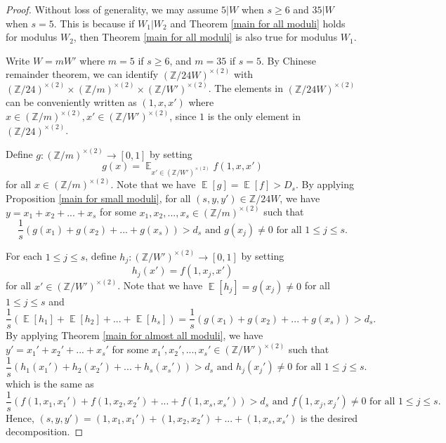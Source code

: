 \documentclass[11pt]{amsart}
\theoremstyle{plain} %
\theoremstyle{remark}
\numberwithin{equation}{section}
\newcommand{\E}{\mathop{\mathbb{E}}}
\newcommand{\Z}{\mathbb{Z}}
\begin{document}
\begin{proof}
    Without loss of generality, we may assume $5|W$ when $s\geq 6$ and $35|W$ when $s=5$. This is because if $W_1|W_2$ and Theorem \ref{main for all moduli} holds for modulus $W_2$, then Theorem \ref{main for all moduli} is also true for modulus $W_1$.

    Write $W=mW'$ where $m=5$ if $s\geq 6$, and $m=35$ if $s=5$. By Chinese remainder theorem, we can identify $(\Z/24W)^{\times(2)}$ with $(\Z/24)^{\times(2)}\times(\Z/m)^{\times(2)}\times(\Z/W')^{\times(2)}$. The elements in $(\Z/24W)^{\times(2)}$ can be conveniently written as $(1,x,x')$ where $x\in (\Z/m)^{\times(2)},x'\in (\Z/W')^{\times(2)}$, since $1$ is the only element in $(\Z/24)^{\times(2)}$.

    Define $g:(\Z/m)^{\times(2)}\longrightarrow[0,1]$ by setting
    \begin{equation*}
        g(x)=\E_{x'\in(\Z/W')^{\times(2)}}f(1,x,x')
    \end{equation*}
    for all $x\in(\Z/m)^{\times(2)}$. Note that we have $\E[g]=\E[f]>D_s$. By applying Proposition \ref{main for small moduli}, for all $(s,y,y')\in \Z/24W$, we have $y=x_1+x_2+...+x_s$ for some $x_1,x_2,...,x_s\in (\Z/m)^{\times(2)}$ such that
    \begin{equation*}
        \text{$\frac{1}{s}(g(x_1)+g(x_2)+...+g(x_s))>d_s$ and $g(x_j)\neq 0$ for all $1\leq j \leq s$.}
    \end{equation*}

    For each $1\leq j\leq s$, define $h_j:(\Z/W')^{\times(2)}\longrightarrow[0,1]$ by setting
    \begin{equation*}
        h_j(x')=f(1,x_j,x')
    \end{equation*}
    for all $x'\in (\Z/W')^{\times(2)}$. Note that we have $\E[h_j]=g(x_j)\neq 0$ for all $1\leq j\leq s$ and
    \begin{equation*}
        \frac{1}{s}(\E[h_1]+\E[h_2]+...+\E[h_s])=\frac{1}{s}(g(x_1)+g(x_2)+...+g(x_s))>d_s.
    \end{equation*}
    By applying Theorem \ref{main for almost all moduli}, we have $y'=x_1'+x_2'+...+x_s'$ for some $x_1',x_2',...,x_s'\in (\Z/W')^{\times(2)}$ such that
    \begin{equation*}
        \text{$\frac{1}{s}(h_1(x_1')+h_2(x_2')+...+h_s(x_s'))>d_s$ and $h_j(x_j')\neq 0$ for all $1\leq j \leq s$.}
    \end{equation*}
    which is the same as
    \begin{equation*}
        \text{$\frac{1}{s}(f(1,x_1,x_1')+f(1,x_2,x_2')+...+f(1,x_s,x_s'))>d_s$ and $f(1,x_j,x_j')\neq 0$ for all $1\leq j \leq s$.}
    \end{equation*}
    Hence, $(s,y,y')=(1,x_1,x_1')+(1,x_2,x_2')+...+(1,x_s,x_s')$ is the desired decomposition.
\end{proof}
\end{document}

